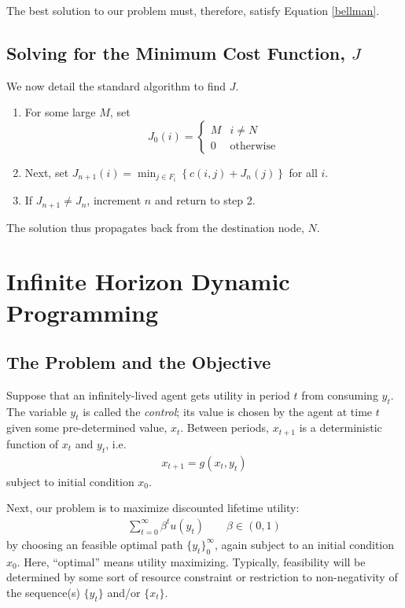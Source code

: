 \documentclass[a4paper,12pt]{scrartcl}
\begin{document}
The best solution to our problem must, therefore, satisfy Equation
\ref{bellman}.

\subsection{Solving for the Minimum Cost Function, $J$}

We now detail the standard algorithm to find $J$.
\begin{enumerate}
    \item For some large $M$, set
	\begin{equation}
	    J_0(i) = \begin{cases} M & i \neq N \\ 
				    0 & \text{otherwise}
		    \end{cases}
	\end{equation}

    \item Next, set 
	$J_{n+1}(i) = \min_{j \in F_i} \left\{ c(i,j) + J_n(j)\right\}$
	for all $i$.

    \item If $J_{n+1} \neq J_n$, increment $n$ and return to step 2.

\end{enumerate}
The solution thus propagates back from the destination node, $N$.


\section{Infinite Horizon Dynamic Programming}

\subsection{The Problem and the Objective}

Suppose that an infinitely-lived agent gets utility in period
$t$ from consuming $y_t$. The variable $y_t$ is called the
\emph{control}; its value is chosen by the agent at time $t$
given some pre-determined value, $x_t$. Between periods,
$x_{t+1}$ is a deterministic function of $x_t$ and $y_t$, i.e.
\begin{align}
  \label{xevol}
  x_{t+1} = g(x_t, y_t)
\end{align}
subject to initial condition $x_0$.

Next, our problem is to maximize discounted lifetime utility: 
\begin{align}
  \label{toughproblem}
  \sum^\infty_{t=0} \beta^t u(y_t)
  \qquad \beta\in (0,1)
\end{align}
by choosing an feasible optimal path $\{ y_t \}_0^\infty$, again
subject to an initial condition $x_0$.  Here,
``optimal'' means utility maximizing. Typically, feasibility
will be determined by some sort of resource constraint or
restriction to non-negativity of the sequence(s) $\{ y_t \}$
and/or $\{x_t\}$. 
\end{document}
